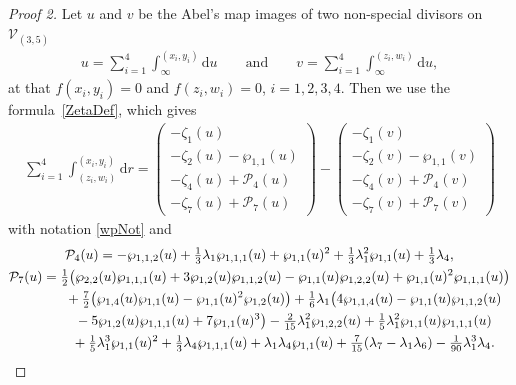 \documentclass[pdftex]{sigma}
\numberwithin{equation}{section}
\newcommand{\rmd}{\mathrm{d}}
\begin{document}
\begin{proof}[Proof 2]Let {$u$ and $v$ be the Abel's map images of two non-special divisors on $\mathcal{V}_{(3,5)}$}
\begin{gather*}%
 u = \sum_{i=1}^4 \int_{\infty}^{(x_i,y_i)} \rmd u \qquad \text{and}\qquad v = \sum_{i=1}^4 \int_{\infty}^{(z_i,w_i)} \rmd u,
\end{gather*}
at that $f(x_i,y_i)=0$ and $f(z_i,w_i)=0$, $i=1,2,3,4$. Then we use the formula~\eqref{ZetaDef}, which gives
\begin{gather}\label{zetaC35}
 \sum_{i=1}^4 \int_{(z_i,w_i)}^{(x_i,y_i)} \rmd r = \begin{pmatrix}
 -\zeta_1(u) \\
 -\zeta_2(u) - \wp_{1,1}(u)\\
 -\zeta_4(u) + \mathcal{P}_4(u) \\
 -\zeta_7(u) + \mathcal{P}_7(u) \end{pmatrix}
 - \begin{pmatrix}
 -\zeta_1(v) \\
 -\zeta_2(v) - \wp_{1,1}(v)\\
 -\zeta_4(v) + \mathcal{P}_4(v) \\
 -\zeta_7(v) + \mathcal{P}_7(v) \end{pmatrix}
\end{gather}
with notation \eqref{wpNot} and
\begin{gather*}
\mathcal{P}_4(u) = - \wp _{1,1,2}(u) + \tfrac{1}{3} \lambda_1 \wp _{1,1,1}(u) + \wp_{1,1}(u)^2 + \tfrac{1}{3} \lambda_1^2 \wp _{1,1}(u) + \tfrac{1}{3}\lambda_4, \\
\mathcal{P}_7(u) = \tfrac{1}{2} \big(\wp_{2,2}(u)\wp _{1,1,1}(u) + 3\wp_{1,2}(u)\wp _{1,1,2}(u)-\wp_{1,1}(u)\wp _{1,2,2}(u) + \wp_{1,1}(u)^2\wp _{1,1,1}(u)\big) \\
\hphantom{\mathcal{P}_7(u) =}{} + \tfrac{7}{2} \big(\wp_{1,4}(u)\wp_{1,1}(u)-\wp_{1,1}(u)^2\wp_{1,2}(u)\big) + \tfrac{1}{6} \lambda_1 \big(4\wp_{1,1,4}(u) - \wp_{1,1}(u)\wp _{1,1,2}(u) \\
\hphantom{\mathcal{P}_7(u) =}{} - 5 \wp_{1,2}(u)\wp _{1,1,1}(u) + 7 \wp_{1,1}(u)^3 \big) - \tfrac{2}{15} \lambda_1^2 \wp _{1,2,2}(u)+ \tfrac{1}{5} \lambda_1^2 \wp_{1,1}(u) \wp _{1,1,1}(u) \\
\hphantom{\mathcal{P}_7(u) =}{}+ \tfrac{1}{5} \lambda_1^3 \wp_{1,1}(u)^2 + \tfrac{1}{3} \lambda_4 \wp_{1,1,1}(u) + \lambda_1 \lambda_4 \wp_{1,1}(u)+ \tfrac{7}{15}(\lambda_7-\lambda_1\lambda_6)- \tfrac{1}{90} \lambda_1^3 \lambda_4.
\end{gather*}


\end{proof}
\end{document}
